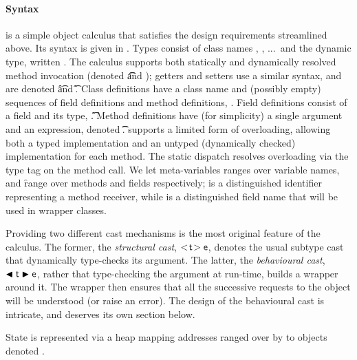 \documentclass[acmlarge, anonymous, authordraft]{acmart}
\begin{document}
\paragraph{Syntax}  \kafka is a simple object calculus that satisfies the design requirements streamlined above. Its syntax is given in .   Types consist of class names \C, \D, ...\ and the dynamic type, written
\any.  The calculus supports both statically and dynamically resolved method invocation (denoted  \KCall\e\m\e\t\t and \DynCall\e\m\e); getters and setters use a similar syntax, and are denoted \Get\e\f\t and \Set\e\f\t\e.
    Class definitions have a class name and (possibly empty) sequences of
field definitions and method definitions, \Class\C{\b\fd}{\b\md}. Field
definitions consist of a field and its type, \Fdef\f\t. Method definitions
have (for simplicity) a single argument and an expression, denoted \Mdef\m\x\t\t\e.
  \kafka   supports a limited form of overloading, allowing both a typed implementation and an untyped (dynamically checked) implementation for each method. The static dispatch resolves overloading via the type tag
on the method call.  We let meta-variables \x ranges over variable names, \m and \f range over
methods and fields respectively; \this is a distinguished identifier
representing a method receiver, while \that is a distinguished field name that will be used
in wrapper classes. 

 Providing two different cast mechanisms is the most original feature of the calculus.
The former, the \emph{structural cast}, \(\SubCast\t\e\), denotes the usual subtype cast that dynamically type-checks its argument.  The latter, the \emph{behavioural cast}, \(\BehCast\t\e\), rather that type-checking the argument at run-time, builds a wrapper around it.  The wrapper then ensures that all the successive requests to the object will be  understood (or raise an error). The design of the behavioural cast is intricate, and deserves its own section below.  

State is represented via a heap \s mapping addresses ranged over by \a
to objects denoted \hspace{-1mm}\obj\C{\b\a}.
\end{document}
